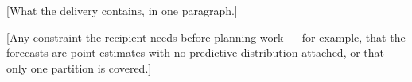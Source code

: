 %

[What the delivery contains, in one paragraph.]

[Any constraint the recipient needs before planning work --- for
example, that the forecasts are point estimates with no predictive
distribution attached, or that only one partition is covered.]
